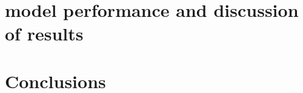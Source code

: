 \documentclass[a4paper,12pt,reqno]{report}
\begin{document}
\section{model performance and discussion of results}
\label{sec:model performance and discussion of results}


\section{Conclusions}
    
\newpage


\end{document}
